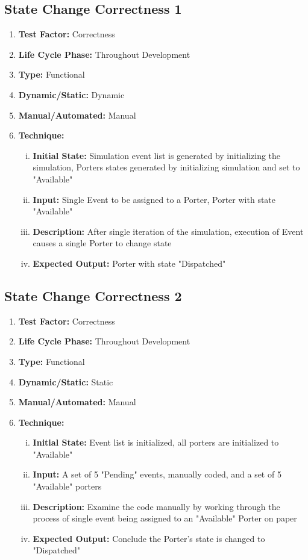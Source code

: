 \documentclass[paper=letter, fontsize=10pt]{scrartcl}
\numberwithin{equation}{section}		%
\numberwithin{figure}{section}			%
\numberwithin{table}{section}				%
\begin{document}
\subsection{State Change Correctness 1}
\begin{enumerate}[]
	\item \textbf{Test Factor:} Correctness
	\item \textbf{Life Cycle Phase:} Throughout Development
	\item \textbf{Type:} Functional
	\item \textbf{Dynamic/Static:} Dynamic
	\item \textbf{Manual/Automated:} Manual
	\item \textbf{Technique:}
		\begin{enumerate}[(i)]
			\item \textbf{Initial State:} Simulation event list is generated by initializing the simulation, Porters states generated by initializing simulation and set to "Available"
			\item \textbf{Input:} Single Event to be assigned to a Porter, Porter with state "Available"
			\item \textbf{Description:} After single iteration of the simulation, execution of Event causes a single Porter to change state
			\item \textbf{Expected Output:} Porter with state "Dispatched"
		\end{enumerate}
\end{enumerate}

\subsection{State Change Correctness 2}
\begin{enumerate}[]
	\item \textbf{Test Factor:} Correctness
	\item \textbf{Life Cycle Phase:} Throughout Development
	\item \textbf{Type:} Functional
	\item \textbf{Dynamic/Static:} Static
	\item \textbf{Manual/Automated:} Manual
	\item \textbf{Technique:}
		\begin{enumerate}[(i)]
			\item \textbf{Initial State:} Event list is initialized, all porters are initialized to "Available"
			\item \textbf{Input:} A set of 5 "Pending" events, manually coded, and a set of 5 "Available" porters  
			\item \textbf{Description:} Examine the code manually by working through the process of single event being assigned to an "Available" Porter on paper
			\item \textbf{Expected Output:} Conclude the Porter's state is changed to "Dispatched"
		\end{enumerate}
\end{enumerate}
\end{document}
